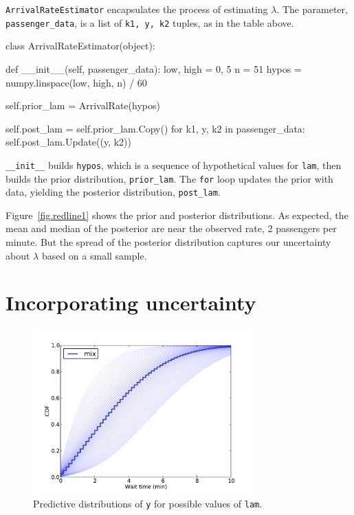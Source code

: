 \documentclass[12pt]{book}
\theoremstyle{exercise}
\begin{document}
{\tt ArrivalRateEstimator} encapsulates the process of estimating
$\lambda$.  The parameter, \verb"passenger_data", is a list
of {\tt k1, y, k2} tuples, as in the table above.

\begin{code}
class ArrivalRateEstimator(object):

    def __init__(self, passenger_data):
        low, high = 0, 5
        n = 51
        hypos = numpy.linspace(low, high, n) / 60

        self.prior_lam = ArrivalRate(hypos)

        self.post_lam = self.prior_lam.Copy()
        for k1, y, k2 in passenger_data:
            self.post_lam.Update((y, k2))
\end{code}

\verb"__init__" builds
{\tt hypos}, which is a sequence of hypothetical values for {\tt lam},
then builds the prior distribution, \verb"prior_lam".
The {\tt for} loop updates the prior with data, yielding the posterior
distribution, \verb"post_lam".

Figure~\ref{fig.redline1} shows
the prior and posterior distributions.  As expected, the mean and
median of the posterior are near the observed rate, 2 passengers per
minute.  But the spread of the posterior distribution captures our
uncertainty about $\lambda$ based on a small sample.


\section{Incorporating uncertainty}

\begin{figure}
\centerline{\includegraphics[height=2.5in]{figs/redline4.pdf}}
\caption{Predictive distributions of {\tt y} for possible values
  of {\tt lam}. }
\label{fig.redline4}
\end{figure}
\end{document}
